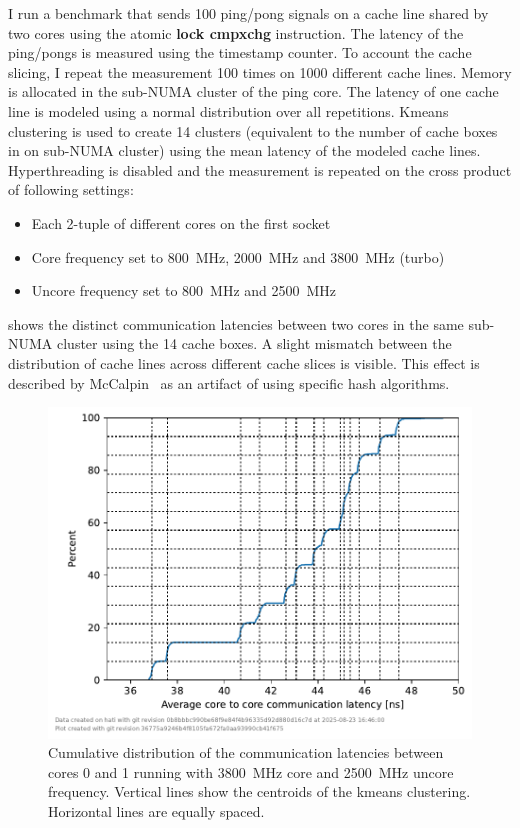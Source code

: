 I run a benchmark that sends \SI{100}{} ping/pong signals on a cache line shared by two cores using the atomic \textbf{lock cmpxchg} instruction.
The latency of the ping/pongs is measured using the timestamp counter.
To account the cache slicing, I repeat the measurement \SI{100}{} times on \SI{1000}{} different cache lines.
Memory is allocated in the sub-NUMA cluster of the ping core.
The latency of one cache line is modeled using a normal distribution over all repetitions.
Kmeans clustering is used to create \SI{14}{} clusters (equivalent to the number of cache boxes in on sub-NUMA cluster) using the mean latency of the modeled cache lines.
Hyperthreading is disabled and the measurement is repeated on the cross product of following settings:
\begin{itemize}
    \item Each 2-tuple of different cores on the first socket
    \item Core frequency set to \SI{800}{\MHz}, \SI{2000}{\MHz} and \SI{3800}{\MHz} (turbo)
    \item Uncore frequency set to \SI{800}{\MHz} and \SI{2500}{\MHz}
\end{itemize}

 shows the distinct communication latencies between two cores in the same sub-NUMA cluster using the \SI{14}{} cache boxes.
A slight mismatch between the distribution of cache lines across different cache slices is visible.
This effect is described by McCalpin~\cite{McCalpin_2018_IntelAddressHashing} as an artifact of using specific hash algorithms.

\begin{figure}[]
    \centering
    \includegraphics[width=0.8\columnwidth]{fig/core-to-core-latency/core0to1latency.pdf}
    \caption{\label{fig:cbo-latencies}Cumulative distribution of the communication latencies between cores 0 and 1 running with \SI{3800}{\MHz} core and \SI{2500}{\MHz} uncore frequency.
    Vertical lines show the centroids of the kmeans clustering.
    Horizontal lines are equally spaced.}
\end{figure}


